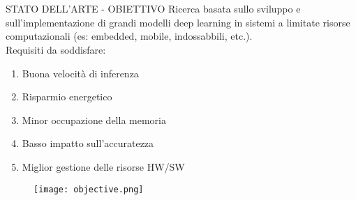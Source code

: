 \section{}

\begin{frame}{STATO DELL'ARTE - OBIETTIVO}
    Ricerca basata sullo sviluppo e sull'implementazione di grandi modelli deep learning in sistemi a 
    limitate risorse computazionali (es: embedded, mobile, indossabbili, etc.).\\
    Requisiti da soddisfare:\\
    \hspace{1cm}
    \begin{minipage}{\linewidth}
        \centering
        \begin{minipage}{0.45\linewidth}
            \begin{enumerate}
                \item Buona velocità di inferenza
                \item Risparmio energetico
                \item Minor occupazione della memoria
                \item Basso impatto sull'accuratezza
                \item Miglior gestione delle risorse HW/SW
            \end{enumerate}
        \end{minipage}
        \begin{minipage}{0.45\linewidth}
            \begin{figure}
                \centering
                \texttt{[image: objective.png]}
                \centering
            \end{figure}
        \end{minipage}
    \end{minipage}
\end{frame}